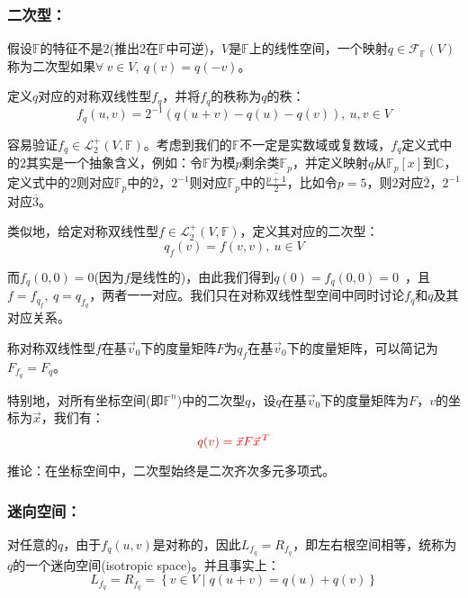 \documentclass[zihao=5,UTF8]{report}
\theoremstyle{mystyle} %
\begin{document}
\subsubsection{二次型：}
假设$\mathbb{F}$的特征不是2(推出2在$\mathbb{F}$中可逆)，$V$是$\mathbb{F}$上的线性空间，一个映射$q \in \mathcal{F}_{\mathbb{F}}(V)$称为二次型如果$\forall\ v \in V,\ q(v) = q(-v)$。\par
定义$q$对应的对称双线性型$f_q$，并将$f_q$的秩称为$q$的秩：
\begin{equation*}
    f_q(u,v) = 2^{-1}(q(u+v) - q(u)-q(v)),\ u,v \in V
\end{equation*}

{\color{gray}\small 容易验证$f_q \in \mathcal{L}_2^+(V,\mathbb{F})$。考虑到我们的$\mathbb{F}$不一定是实数域或复数域，$f_q$定义式中的$2$其实是一个抽象含义，例如：令$\mathbb{F}$为模$p$剩余类$\mathbb{F}_p$，并定义映射$q$从$\mathbb{F}_p[x]$到$\mathbb{C}$，定义式中的$2$则对应$\mathbb{F}_p$中的$\overline{2}$，$2^{-1}$则对应$\mathbb{F}_p$中的$\overline{\frac{p+1}{2}}$，比如令$p = 5$，则$2$对应$\overline{2}$，$2^{-1}$对应$\overline{3}$。}

类似地，给定对称双线性型$f \in \mathcal{L}_2^+(V,\mathbb{F})$，定义其对应的二次型：
\begin{equation*}
    q_f(v) = f(v,v),\ u \in V
\end{equation*}\par

{\color{gray}\small  而$f_q(0,0) = 0$(因为$f$是线性的)，由此我们得到$q(0) = f_q(0,0) = 0$\ ，且$f = f_{q_f},\ q = q_{f_q}$，两者一一对应。我们只在对称双线性型空间中同时讨论$f_q$和$q$及其对应关系。}\par
称对称双线性型$f$在基$\vec{v}_0$下的度量矩阵$F$为$q_f$在基$\vec{v}_0$下的度量矩阵，可以简记为$F_{f_q} = F_q$。\par
特别地，对所有坐标空间(即$\mathbb{F}^n$)中的二次型$q$，设$q$在基$\vec{v}_0$下的度量矩阵为$F$，$v$的坐标为$\vec{x}$，我们有：
\begin{equation*}\color{red}
    q(v) = \vec{x} F \vec{x}^{\,T}
\end{equation*}\par
推论：在坐标空间中，二次型始终是二次齐次多元多项式。
\subsubsection{迷向空间：}
对任意的$q$，由于$f_q(u,v)$是对称的，因此$L_{f_q} = R_{f_q}$，即左右根空间相等，统称为$q$的一个迷向空间(isotropic space)。并且事实上：
\begin{equation*}
    L_{f_q} = R_{f_q} = \left\{v\in V\mid q(u+v) = q(u) + q(v) \right\}
\end{equation*}
\end{document}
